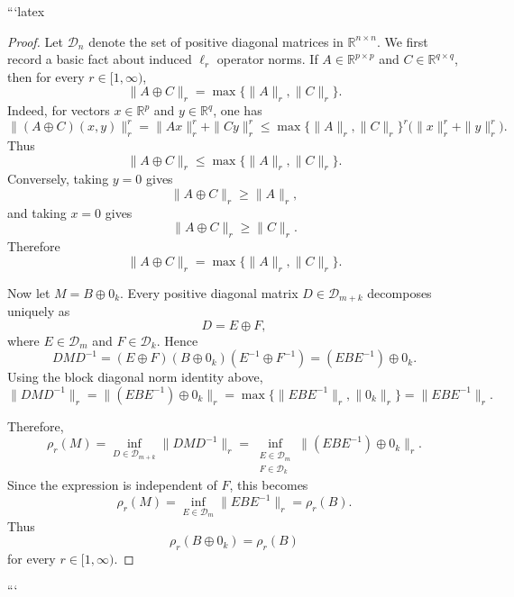 ```latex
\begin{proof}
Let $\mathcal{D}_n$ denote the set of positive diagonal matrices in
$\mathbb{R}^{n \times n}$. We first record a basic fact about induced
$\ell_r$ operator norms. If $A \in \mathbb{R}^{p \times p}$ and
$C \in \mathbb{R}^{q \times q}$, then for every $r \in [1,\infty)$,
\[
\|A \oplus C\|_r=\max\{\|A\|_r,\|C\|_r\}.
\]
Indeed, for vectors $x \in \mathbb{R}^p$ and $y \in \mathbb{R}^q$, one has
\[
\|(A \oplus C)(x,y)\|_r^r
=
\|Ax\|_r^r+\|Cy\|_r^r
\le
\max\{\|A\|_r,\|C\|_r\}^r
\bigl(\|x\|_r^r+\|y\|_r^r\bigr).
\]
Thus
\[
\|A \oplus C\|_r \le \max\{\|A\|_r,\|C\|_r\}.
\]
Conversely, taking $y=0$ gives
\[
\|A \oplus C\|_r \ge \|A\|_r,
\]
and taking $x=0$ gives
\[
\|A \oplus C\|_r \ge \|C\|_r.
\]
Therefore
\[
\|A \oplus C\|_r=\max\{\|A\|_r,\|C\|_r\}.
\]

Now let $M=B \oplus 0_k$. Every positive diagonal matrix
$D \in \mathcal{D}_{m+k}$ decomposes uniquely as
\[
D=E \oplus F,
\]
where $E \in \mathcal{D}_m$ and $F \in \mathcal{D}_k$. Hence
\[
DMD^{-1}
=
(E \oplus F)(B \oplus 0_k)(E^{-1}\oplus F^{-1})
=
(EBE^{-1}) \oplus 0_k.
\]
Using the block diagonal norm identity above,
\[
\|DMD^{-1}\|_r
=
\|(EBE^{-1}) \oplus 0_k\|_r
=
\max\{\|EBE^{-1}\|_r,\|0_k\|_r\}
=
\|EBE^{-1}\|_r.
\]

Therefore,
\[
\rho_r(M)
=
\inf_{D \in \mathcal{D}_{m+k}} \|DMD^{-1}\|_r
=
\inf_{\substack{E \in \mathcal{D}_m \\ F \in \mathcal{D}_k}}
\|(EBE^{-1}) \oplus 0_k\|_r.
\]
Since the expression is independent of $F$, this becomes
\[
\rho_r(M)
=
\inf_{E \in \mathcal{D}_m} \|EBE^{-1}\|_r
=
\rho_r(B).
\]
Thus
\[
\boxed{\rho_r(B \oplus 0_k)=\rho_r(B)}
\]
for every $r \in [1,\infty)$.
\end{proof}
```